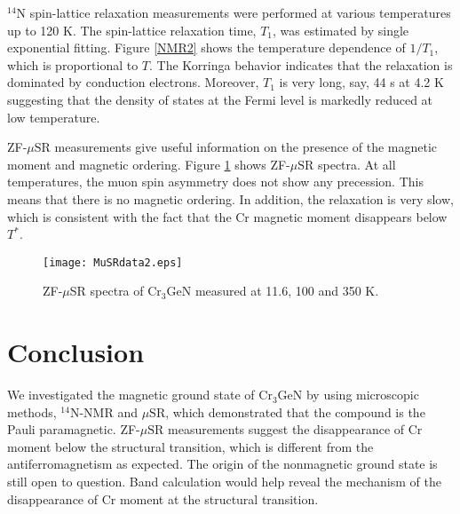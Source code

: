 \documentclass[a4paper]{jpconf}
\newcommand{\CGN}{\mathrm{Cr_3GeN}}
\newcommand{\muSR}{\mu \mathrm{SR}}
\newcommand{\Nitnuc}{^{14}\mathrm{N}}
\begin{document}
$\Nitnuc$ spin-lattice relaxation measurements were performed at various temperatures up to 120 K. The spin-lattice relaxation time, $T_1$, was estimated by single exponential fitting. Figure \ref{NMR2} shows the temperature dependence of $1/ T_1$,  
which is proportional to $T$. 
The Korringa behavior indicates that the relaxation is dominated by conduction electrons. 
Moreover, $T_1$ is very long, say, 44 s at 4.2 K suggesting that the density of states at the Fermi level is markedly reduced at low temperature.
	
ZF-$\muSR$ measurements give useful information on the presence of the magnetic moment and magnetic ordering.
Figure \ref{muSR1} shows ZF-$\muSR$ spectra. 
At all temperatures, the muon spin asymmetry does not show any precession. This means that there is no magnetic ordering. 
In addition, the relaxation is very slow, which is consistent with the fact that the Cr magnetic moment disappears below $T^*$.

\begin{figure}[h]
	\centering
	\texttt{[image: MuSRdata2.eps]}
	\caption{ZF-$\mu$SR spectra of $\CGN$ measured at 11.6, 100 and 350 K.}
	\label{muSR1}
\end{figure}



\section{Conclusion}
We investigated the magnetic ground state of $\CGN$ by using microscopic methods, $\Nitnuc$-NMR and $\muSR$, which demonstrated that the compound is the Pauli paramagnetic. 
ZF-$\muSR$ measurements suggest the disappearance of Cr moment below the structural transition, 
which is  different from the antiferromagnetism as expected.
The origin of the nonmagnetic ground state is still open to question. 
Band calculation would help reveal the mechanism of the disappearance of Cr moment at the structural transition.
\end{document}
